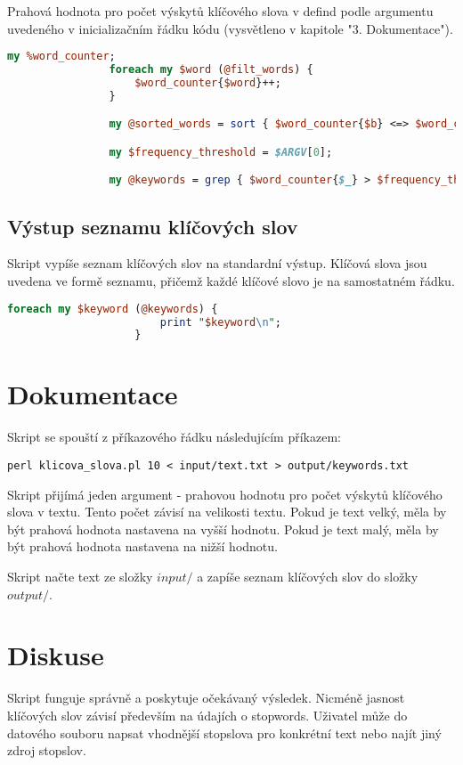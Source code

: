 \documentclass[a4paper,11pt]{article}
\begin{document}
    \newpage
    \begin{minipage}[t]{0.5\textwidth}
            \par Prahová hodnota pro počet výskytů klíčového slova v defind podle argumentu uvedeného v inicializačním řádku kódu \cite{arg} (vysvětleno v kapitole "3. Dokumentace").
            \begin{lstlisting}[language=Perl]
                my %word_counter;
                foreach my $word (@filt_words) {
                    $word_counter{$word}++;
                }

                my @sorted_words = sort { $word_counter{$b} <=> $word_counter{$a} } keys %word_counter;

                my $frequency_threshold = $ARGV[0]; 

                my @keywords = grep { $word_counter{$_} > $frequency_threshold } @sorted_words;
            \end{lstlisting} 
            \subsection{Výstup seznamu klíčových slov}
                Skript vypíše seznam klíčových slov na standardní výstup. Klíčová slova jsou uvedena ve formě seznamu, přičemž každé klíčové slovo je na samostatném řádku.
                \begin{lstlisting}[language=Perl]
                    foreach my $keyword (@keywords) {
                        print "$keyword\n";
                    }
                \end{lstlisting}
    \end{minipage}
    \hspace{10pt}
    \begin{minipage}[t]{0.5\textwidth} 
        \section{Dokumentace}
            Skript se spouští z příkazového řádku následujícím příkazem:

            \begin{center}
                \texttt{perl klicova\_slova.pl 10 < input/text.txt > output/keywords.txt}
            \end{center}
            Skript přijímá jeden argument - prahovou hodnotu pro počet výskytů klíčového slova v textu. Tento počet závisí na velikosti textu. Pokud je text velký, měla by být prahová hodnota nastavena na vyšší hodnotu. Pokud je text malý, měla by být prahová hodnota nastavena na nižší hodnotu.
            \par Skript načte text ze složky $input/$ a zapíše seznam klíčových slov do složky $output/$.

        \section{Diskuse}
            Skript funguje správně a poskytuje očekávaný výsledek. Nicméně jasnost klíčových slov závisí především na údajích o stopwords. Uživatel může do datového souboru napsat vhodnější stopslova pro konkrétní text nebo najít jiný zdroj stopslov.
    \end{minipage}
\end{document}
